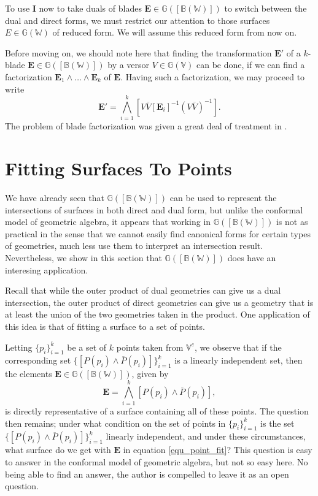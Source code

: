 \documentclass{birkjour}
\theoremstyle{definition}
\theoremstyle{remark}
\numberwithin{equation}{section}
\newcommand{\G}{\mathbb{G}}
\newcommand{\V}{\mathbb{V}}
\newcommand{\W}{\mathbb{W}}
\newcommand{\B}{\mathbb{B}}
\begin{document}
To use $\mathbf{I}$ now to take duals of blades $\mathbf{E}\in\G([\B(\W)])$ to
switch between the dual and direct forms, we must restrict our attention
to those surfaces $E\in\G(\W)$ of reduced form.  We will assume this
reduced form from now on.

Before moving on, we should note here that finding the transformation $\mathbf{E}'$ of
a $k$-blade $\mathbf{E}\in\G([\B(\W)])$ by a versor $V\in\G(\V)$ can be done, if
we can find a factorization $\mathbf{E}_1\wedge\dots\wedge\mathbf{E}_k$ of $\mathbf{E}$.
Having such a factorization, we may proceed to write
\begin{equation}
\mathbf{E}' = \bigwedge_{i=1}^k[V\overline{V}[\mathbf{E}_i]^{-1}(V\overline{V})^{-1}].
\end{equation}
The problem of blade factorization was given a great deal of treatment in \cite{}.

\section{Fitting Surfaces To Points}

We have already seen that $\G([\B(\W)])$ can be used to represent
the intersections of surfaces in both direct and dual form, but unlike
the conformal model of geometric algebra, it appears that working
in $\G([\B(\W)])$ is not as practical in the sense that we cannot easily
find canonical forms for certain types of geometries, much less use
them to interpret an intersection result.  Nevertheless, we show
in this section that $\G([\B(\W)])$ does have an interesing application.

Recall that while the outer product of dual geometries can give us a
dual intersection, the outer product of direct geometries can give us
a geometry that is at least the union of the two geometries taken in the product.
One application of this idea is that of fitting a surface to a set of points.

Letting $\{p_i\}_{i=1}^k$ be a set of $k$ points taken from $\V^e$,
we observe that if the corresponding set $\{[P(p_i)\wedge\overline{P}(p_i)]\}_{i=1}^k$
is a linearly independent set, then the elements $\mathbf{E}\in\G([\B(\W)])$, given by
\begin{equation}\label{equ_point_fit}
\mathbf{E} = \bigwedge_{i=1}^k[P(p_i)\wedge\overline{P}(p_i)],
\end{equation}
is directly representative of a surface containing all of these points.  The question
then remains; under what condition on the set of points in $\{p_i\}_{i=1}^k$
is the set $\{[P(p_i)\wedge\overline{P}(p_i)]\}_{i=1}^k$ linearly independent,
and under these circumstances, what surface do we get with $\mathbf{E}$
in equation \eqref{equ_point_fit}?  This question is easy to answer in
the conformal model of geometric algebra, but not so easy here.  No being
able to find an answer, the author is compelled to leave it as an open question.
\end{document}
